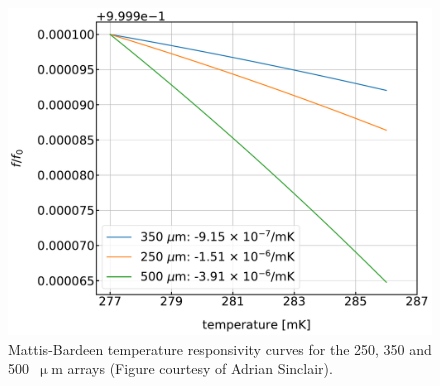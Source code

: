 \begin{figure}[!htbp]
\centering
\includegraphics[width=\textwidth]{figures/blast_data/sweeps/temp_response}
\caption[~Mattis-Bardeen temperature responsivity curves for the 250, 350 and 500  arrays.]{Mattis-Bardeen temperature responsivity curves for the 250, 350 and 500~$\upmu$m arrays (Figure courtesy of Adrian Sinclair).}
\label{fig:temp response}
\end{figure}


